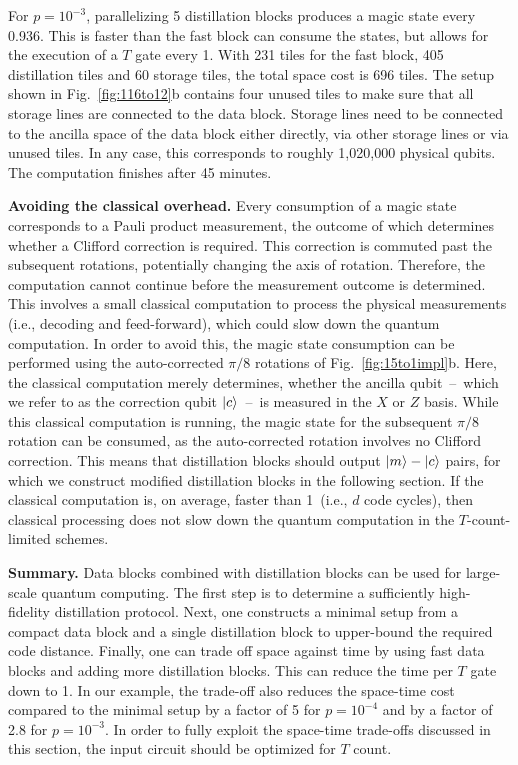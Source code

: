 \documentclass[prx,aps,letterpaper,twocolumn,allowfontchageintitle=true,accepted=2019-02-01]{quantumarticle}
\begin{document}
For $p=10^{-3}$, parallelizing 5 distillation blocks produces a magic state every 0.936\clock. This is faster than the fast block can consume the states, but allows for the execution of a $T$ gate every 1\clock. With 231 tiles for the fast block, 405 distillation tiles and 60 storage tiles, the total space cost is 696 tiles. The setup shown in Fig.~\ref{fig:116to12}b contains four unused tiles to make sure that all storage lines are connected to the data block. Storage lines need to be connected to the ancilla space of the data block either directly, via other storage lines or via unused tiles. In any case, this corresponds to roughly 1,020,000 physical qubits. The computation finishes after 45 minutes.

\textbf{Avoiding the classical overhead.} Every consumption of a magic state corresponds to a Pauli product measurement, the outcome of which determines whether a Clifford correction is required. This correction is commuted past the subsequent rotations, potentially changing the axis of rotation. Therefore, the computation cannot continue before the measurement outcome is determined. This involves a small classical computation to process the physical measurements (i.e., decoding and feed-forward), which could slow down the quantum computation. In order to avoid this, the magic state consumption can be performed using the auto-corrected $\pi/8$ rotations of Fig.~\ref{fig:15to1impl}b. Here, the classical computation merely determines, whether the ancilla qubit~--~which we refer to as the correction qubit $\ket{c}$~--~is measured in the $X$ or $Z$ basis. While this classical computation is running, the magic state for the subsequent $\pi/8$ rotation can be consumed, as the auto-corrected rotation involves no Clifford correction. This means that distillation blocks should output $\ket{m}-\ket{c}$ pairs, for which we construct modified distillation blocks in the following section. If the classical computation is, on average, faster than 1\clock \ (i.e., $d$ code cycles), then classical processing does not slow down the quantum computation in the $T$-count-limited schemes.



\textbf{Summary.}
Data blocks combined with distillation blocks can be used for large-scale quantum computing. The first step is to determine a sufficiently high-fidelity distillation protocol. Next, one constructs a minimal setup from a compact data block and a single distillation block to upper-bound the required code distance. Finally, one can trade off space against time by using fast data blocks and adding more distillation blocks. This can reduce the time per $T$ gate down to 1\clock. In our example, the trade-off also reduces the space-time cost compared to the minimal setup by a factor of 5 for $p=10^{-4}$ and by a factor of 2.8 for $p=10^{-3}$. In order to fully exploit the space-time trade-offs discussed in this section, the input circuit should be optimized for $T$ count.
\end{document}
